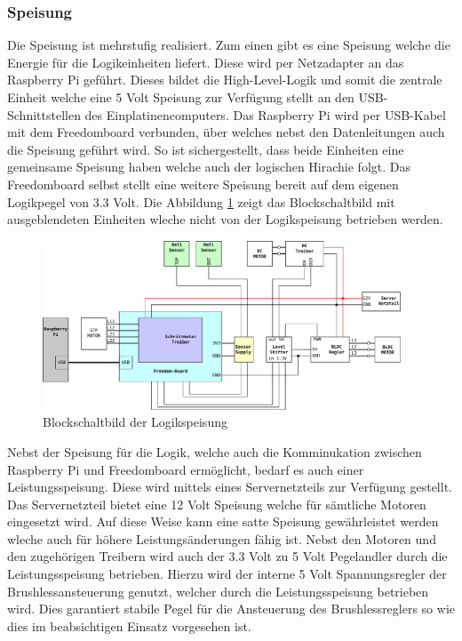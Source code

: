 \subsubsection{Speisung}

Die Speisung ist mehrstufig realisiert. Zum einen gibt es eine Speisung
welche die Energie für die Logikeinheiten liefert. Diese wird per Netzadapter
an das Raspberry Pi geführt. Dieses bildet die High-Level-Logik und somit die
zentrale Einheit welche eine 5 Volt Speisung zur Verfügung stellt an den
USB-Schnittstellen des Einplatinencomputers. Das Raspberry Pi wird per
USB-Kabel mit dem Freedomboard verbunden, über welches nebst den
Datenleitungen auch die Speisung geführt wird. So ist sichergestellt,
dass beide Einheiten eine gemeinsame Speisung haben welche auch der
logischen Hirachie folgt. Das Freedomboard selbst stellt eine weitere
Speisung bereit auf dem eigenen Logikpegel von 3.3 Volt. Die Abbildung
\ref{fig:et-block_logic} zeigt das Blockschaltbild mit ausgeblendeten
Einheiten wleche nicht von der Logikspeisung betrieben werden.

\begin{figure}[h!]
	\centering
	\includegraphics[width=0.95\textwidth]{../../fig/blockdiagram_logic.pdf}
	\caption{Blockschaltbild der Logikspeisung}
	\label{fig:et-block_logic}
\end{figure}

Nebst der Speisung für die Logik, welche auch die Komminukation zwischen
Raspberry Pi und Freedomboard ermöglicht, bedarf es auch einer
Leistungsspeisung. Diese wird mittels eines Servernetzteils zur Verfügung
gestellt. Das Servernetzteil bietet eine 12 Volt Speisung welche für sämtliche
Motoren eingesetzt wird. Auf diese Weise kann eine satte Speisung
gewährleistet werden wleche auch für höhere Leistungsänderungen fähig ist.
Nebst den Motoren und den zugehörigen Treibern wird auch der 3.3 Volt zu 
5 Volt Pegelandler durch die Leistungsspeisung betrieben. Hierzu wird der
interne 5 Volt Spannungsregler der Brushlessansteuerung genutzt, welcher durch
die Leistungsspeisung betrieben wird. Dies garantiert stabile Pegel für die
Ansteuerung des Brushlessreglers so wie dies im beabsichtigen Einsatz
vorgesehen ist.



